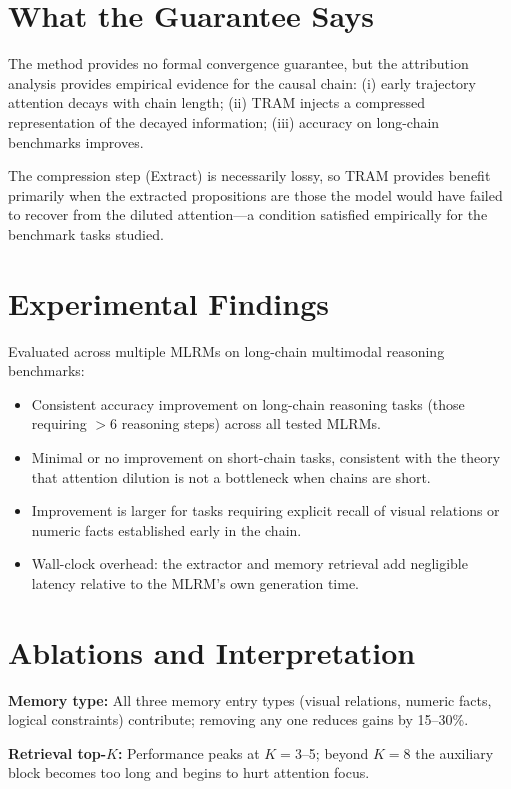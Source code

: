 \documentclass[10pt,twocolumn]{article}
\begin{document}
\section{What the Guarantee Says}

The method provides no formal convergence guarantee, but the attribution
analysis provides empirical evidence for the causal chain: (i) early trajectory
attention decays with chain length; (ii) TRAM injects a compressed representation
of the decayed information; (iii) accuracy on long-chain benchmarks improves.

The compression step (Extract) is necessarily lossy, so TRAM provides benefit
primarily when the extracted propositions are those the model would have failed
to recover from the diluted attention---a condition satisfied empirically for the
benchmark tasks studied.

\section{Experimental Findings}

Evaluated across multiple MLRMs on long-chain multimodal reasoning benchmarks:
\begin{itemize}[itemsep=2pt,parsep=0pt]
  \item Consistent accuracy improvement on long-chain reasoning tasks (those
    requiring $>6$ reasoning steps) across all tested MLRMs.
  \item Minimal or no improvement on short-chain tasks, consistent with the
    theory that attention dilution is not a bottleneck when chains are short.
  \item Improvement is larger for tasks requiring explicit recall of visual
    relations or numeric facts established early in the chain.
  \item Wall-clock overhead: the extractor and memory retrieval add negligible
    latency relative to the MLRM's own generation time.
\end{itemize}

\section{Ablations and Interpretation}

\textbf{Memory type:} All three memory entry types (visual relations, numeric
facts, logical constraints) contribute; removing any one reduces gains by 15--30\%.

\textbf{Retrieval top-$K$:} Performance peaks at $K=3$--5; beyond $K=8$ the
auxiliary block becomes too long and begins to hurt attention focus.
\end{document}
